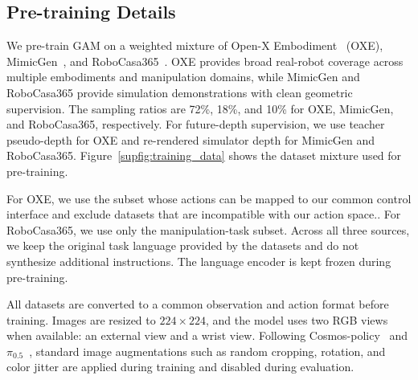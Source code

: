 \documentclass{llmxive}
\begin{document}
\subsection{Pre-training Details}
\label{sec:appendix-pretraining_details}
We pre-train GAM on a weighted mixture of Open-X Embodiment~\cite{collaboration2023open} (OXE), MimicGen~\cite{mandlekar2023mimicgen}, and RoboCasa365~\cite{nasiriany2026robocasa365}. OXE provides broad real-robot coverage across multiple embodiments and manipulation domains, while MimicGen and RoboCasa365 provide simulation demonstrations with clean geometric supervision. The sampling ratios are 72\%, 18\%, and 10\% for OXE, MimicGen, and RoboCasa365, respectively. For future-depth supervision, we use teacher pseudo-depth for OXE and re-rendered simulator depth for MimicGen and RoboCasa365. Figure~\ref{supfig:training_data} shows the dataset mixture used for pre-training.

For OXE, we use the subset whose actions can be mapped to our common control interface and exclude datasets that are incompatible with our action space.. For RoboCasa365, we use only the manipulation-task subset. Across all three sources, we keep the original task language provided by the datasets and do not synthesize additional instructions. The language encoder is kept frozen during pre-training.

All datasets are converted to a common observation and action format before training. Images are resized to \(224\times224\), and the model uses two RGB views when available: an external view and a wrist view. Following Cosmos-policy~\cite{kim2026cosmos} and $\pi_{0.5}$~\cite{pi05}, standard image augmentations such as random cropping, rotation, and color jitter are applied during training and disabled during evaluation.
\end{document}
